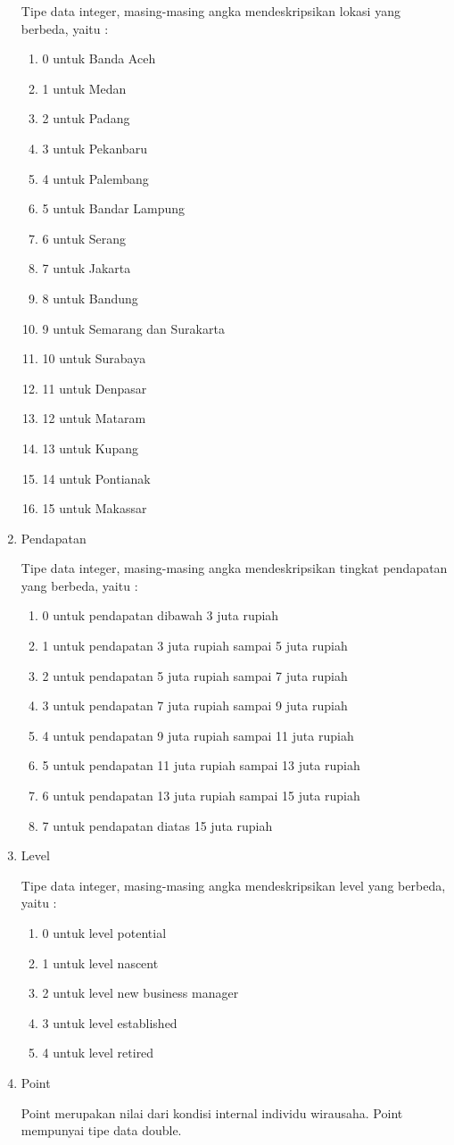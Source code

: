 \begin{enumerate}
		
		Tipe data integer, masing-masing angka mendeskripsikan lokasi yang berbeda, yaitu :
		\begin{enumerate}
			\item 0 untuk Banda Aceh
			\item 1 untuk Medan
			\item 2 untuk Padang
			\item 3 untuk Pekanbaru
			\item 4 untuk Palembang
			\item 5 untuk Bandar Lampung
			\item 6 untuk Serang
			\item 7 untuk Jakarta
			\item 8 untuk Bandung
			\item 9 untuk Semarang dan Surakarta
			\item 10 untuk Surabaya
			\item 11 untuk Denpasar
			\item 12 untuk Mataram
			\item 13 untuk Kupang
			\item 14 untuk Pontianak
			\item 15 untuk Makassar
		\end{enumerate}
		\item Pendapatan
		
		
		Tipe data integer, masing-masing angka mendeskripsikan tingkat pendapatan yang berbeda, yaitu :
		\begin{enumerate}
			\item 0 untuk pendapatan dibawah 3 juta rupiah
			\item 1 untuk pendapatan 3 juta rupiah sampai 5 juta rupiah
			\item 2 untuk pendapatan 5 juta rupiah sampai 7 juta rupiah
			\item 3 untuk pendapatan 7 juta rupiah sampai 9 juta rupiah
			\item 4 untuk pendapatan 9 juta rupiah sampai 11 juta rupiah
			\item 5 untuk pendapatan 11 juta rupiah sampai 13 juta rupiah
			\item 6 untuk pendapatan 13 juta rupiah sampai 15 juta rupiah
			\item 7 untuk pendapatan diatas 15 juta rupiah
		\end{enumerate}
		\item Level
		
		
		Tipe data integer, masing-masing angka mendeskripsikan level yang berbeda, yaitu :
		\begin{enumerate}
			\item 0 untuk level potential
			\item 1 untuk level nascent
			\item 2 untuk level new business manager
			\item 3 untuk level established 
			\item 4 untuk level retired
		\end{enumerate}
		\item Point
		
		
		Point merupakan nilai dari kondisi internal individu wirausaha. Point mempunyai tipe data double.
\end{enumerate}

